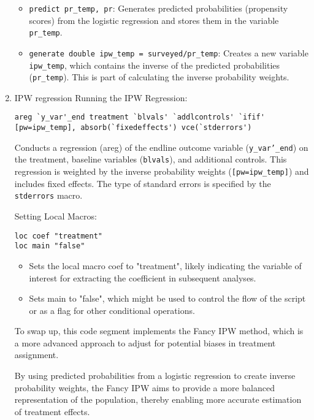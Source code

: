 \documentclass{article}
\begin{document}
\begin{enumerate}
  \begin{itemize}
    \item \texttt{predict pr\_temp, pr}: Generates predicted probabilities (propensity scores) from the logistic regression and stores them in the variable \texttt{pr\_temp}.
    \item \texttt{generate double ipw\_temp = surveyed/pr\_temp}: Creates a new variable \texttt{ipw\_temp}, which contains the inverse of the predicted probabilities (\texttt{pr\_temp}). This is part of calculating the inverse probability weights.
\end{itemize}


\item IPW regression\newline
Running the IPW Regression:

\begin{mdframed}
\begin{verbatim}
areg `y_var'_end treatment `blvals' `addlcontrols' `ifif' 
[pw=ipw_temp], absorb(`fixedeffects') vce(`stderrors')
\end{verbatim}
\end{mdframed}


\vspace{0.2cm}Conducts a regression (areg) of the endline outcome variable (\texttt{y\_var'\_end}) on the treatment, baseline variables (\texttt{blvals}), and additional controls. This regression is weighted by the inverse probability weights (\texttt{[pw=ipw\_temp]}) and includes fixed effects. The type of standard errors is specified by the \texttt{stderrors} macro.\newline



Setting Local Macros:
\begin{mdframed}
\begin{verbatim}
loc coef "treatment"
loc main "false"
\end{verbatim}
\end{mdframed}
\begin{itemize}
    \item Sets the local macro coef to "treatment", likely indicating the variable of interest for extracting the coefficient in subsequent analyses.
    \item Sets main to "false", which might be used to control the flow of the script or as a flag for other conditional operations.
\end{itemize}

\vspace{0.2cm}To swap up, this code segment implements the Fancy IPW method, which is a more advanced approach to adjust for potential biases in treatment assignment.\newline

By using predicted probabilities from a logistic regression to create inverse probability weights, the Fancy IPW aims to provide a more balanced representation of the population, thereby enabling more accurate estimation of treatment effects.
  
\end{enumerate}
\end{document}
